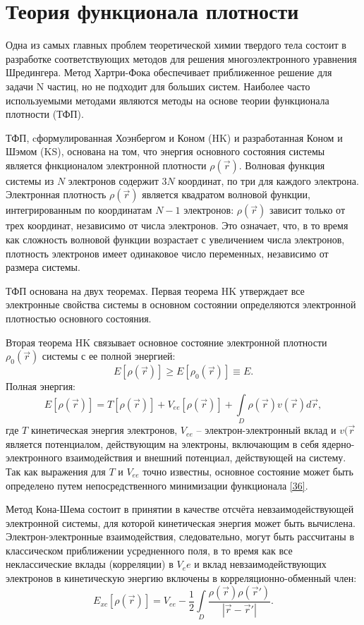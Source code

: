 \chapter{Теория функционала плотности}
Одна из самых главных проблем теоретической химии твердого тела состоит в разработке соответствующих методов для решения многоэлектронного уравнения Шредингера. Метод Хартри-Фока обеспечивает приближенное решение для задачи N частиц, но не подходит для больших систем. Наиболее часто используемыми методами являются методы на основе теории функционала плотности (ТФП).

ТФП, cформулированная Хоэнбергом и Коном (HK) и разработанная Коном и Шэмом (KS), основана на том, что энергия основного состояния системы является фнкционалом электронной плотности \(\rho(\vec{r})\). Волновая функция системы из \(N\) электронов содержит \(3N\) координат, по три для каждого электрона. Электронная плотность \(\rho(\vec{r})\) является квадратом волновой функции, интегрированным по координатам \(N-1\) электронов: \(\rho(\vec{r})\) зависит только от трех координат, независимо от числа электронов. Это означает, что, в то время как сложность волновой функции возрастает с увеличением числа электронов, плотность электронов имеет одинаковое число переменных, независимо от размера системы.

ТФП основана на двух теоремах. Первая теорема HK утверждает все электронные свойства системы в основном состоянии определяются электронной плотностью основного состояния.

Вторая теорема HK связывает основное состояние электронной плотности \(\rho_0(\vec{r})\) системы с ее полной энергией:
\begin{equation}
    E[\rho(\vec{r})] \ge E[\rho_0(\vec{r})] \equiv E.
\end{equation}
Полная энергия:
\begin{equation}
    E[\rho(\vec{r})] = T[\rho(\vec{r})] + V_{ee}[\rho(\vec{r})]+
    \int\limits_D \rho(\vec{r}) v(\vec{r}) d\vec{r},
    \label{eq:36}
\end{equation}
где \(T\) кинетическая энергия электронов, \(V_{ee}\) -- электрон-электронный вклад и \(v(\vec{r}\) является потенциалом, действующим на электроны, включающим в себя ядерно-электронного взаимодействия и внешний потенциал, действующей на систему. Так как выражения для \( T \) и \(V_{ee}\) точно известны, основное состояние может быть определено путем непосредственного минимизации функционала \eqref{36}.

Метод Кона-Шема состоит в принятии в качестве отсчёта невзаимодействующей электронной системы, для которой кинетическая энергия может быть вычислена. Электрон-электронные взаимодействия, следовательно, могут быть рассчитаны в классическом  приближении усредненного поля, в то время как все неклассические вклады (корреляции) в \(V_ee\) и вклад невзаимодействующих электронов в кинетическую энергию включены в корреляционно-обменный член:
\begin{equation}
    E_{xc}[\rho(\vec{r})] = V_{ee} - \frac{1}{2}\int\limits_{D}\frac{\rho(\vec{r})\rho(\vec{r}')}{|\vec{r} - \vec{r}'|}.
    \label{eq:37}
\end{equation}

